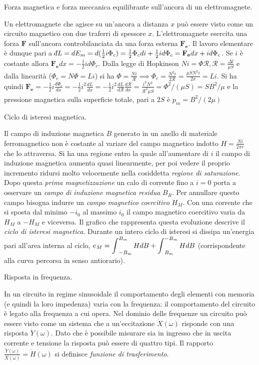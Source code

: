 \documentclass[answers, a4paper,12pt]{exam}
\def\dbar{{\mathchar'26\mkern-12mu d}}
\newcommand{\bigint}{\mathop{\mathlarger{\int}}}
\begin{document}
\begin{questions}
	\question
	Forza magnetica e forza meccanica equilibrante sull’ancora di un elettromagnete.
	\begin{solution}Un elettromagnete che agisce su un'ancora a distanza $x$ può essere visto come un circuito magnetico con due traferri di spessore $x$. L'elettromagnete esercita una forza $\mathbf{F}$ sull'ancora controbilanciata da una forza esterna $\mathbf{F_e}$. Il lavoro elementare è dunque pari a $\dbar L = dE_m = d(\frac{1}{2}i \Phi_c) = \frac{1}{2} \Phi_c di + \frac{1}{2} i d\Phi_c = \mathbf{F_e} dx + i d\Phi_c$. Se $i$ è costante allora $\mathbf{F_e} dx = -\frac{1}{2} i d\Phi_c$. Dalla legge di Hopkinson $N i = \Phi \mathcal{R}, \mathcal{R} = \frac{\Delta l}{\mu S}$ e dalla linearità ($\Phi_c = N \Phi = L i$) si ha $\Phi = \frac{Ni}{\mathcal{R}} \implies \Phi_c = \frac{N^2 i}{2\mathcal{R}} = \frac{\mu S N^2 i}{2x} = Li$. Si ha quindi $\mathbf{F_e} = -\frac{1}{2} i \frac{d\Phi_c}{dx} = -\frac{1}{2} i^2 \frac{dL}{dx} = -\frac{1}{2} i^2 \frac{dL}{d\mathcal{R}} \frac{d\mathcal{R}}{dx} = \frac{i^2 N^2}{\mathcal{R}^2 \mu S} = \Phi^2 / (\mu S) = S B^2 / \mu$ e la pressione magnetica sulla superficie totale, pari a  $2S$ è $p_m = B^2 / (2 \mu)$
		\end{solution}
	\question
	Ciclo di isteresi magnetica.
	\begin{solution}
		Il campo di induzione magnetica $B$ generato in un anello di materiale ferromagnetico non è costante al variare del campo magnetico indotto $H = \frac{Ni}{2 \pi r}$ che lo attraversa. Si ha una regione entro la quale all'aumentare di $i$ il campo di induzione magnetica aumenta quasi linearmente, per poi vedere il proprio incremento ridursi molto velocemente nella cosiddetta \textit{regione di saturazione}. Dopo questa \textit{prima magnetizzazione} un calo di corrente fino a $i = 0$ porta a osservare un \textit{campo di induzione magnetica residua} $B_R$. Per annullare questo campo bisogna indurre un \textit{campo magnetico coercitivo} $H_M$. Con una corrente che si sposta dal minimo $-i_0$ al massimo $i_0$ il campo magnetico coercitivo varia da $H_M$ a $-H_M$ e viceversa. Il grafico che rappresenta questa evoluzione descrive il \textit{ciclo di isteresi magnetica}. Durante un intero ciclo di isteresi si dissipa un'energia pari all'area interna al ciclo, $e_M = \bigint_{-B_m}^{B_m} H dB + \bigint_{B_m}^{-B_m} H dB$ (corrispondente alla curva percorsa in senso antiorario).
	\end{solution}
	\question
	Risposta in frequenza.
	\begin{solution}
In un circuito in regime sinusoidale il comportamento degli elementi con memoria (e quindi la loro impedenza) varia con la frequenza: il comportamento del circuito è legato alla frequenza a cui opera. Nel dominio delle frequenze un circuito può essere visto come un sistema che a un'eccitazione $\dot{X}(\omega)$ risponde con una risposta $\dot{Y}(\omega)$. Dato che è possibile misurare sia in ingresso che in uscita corrente e tensione la risposta può essere di quattro tipi. Il rapporto $\frac{\dot{Y}(\omega)}{\dot{X}(\omega)} = \dot{H}(\omega)$ si definisce \textit{funzione di trasferimento}.

\end{solution}
\end{questions}
\end{document}
